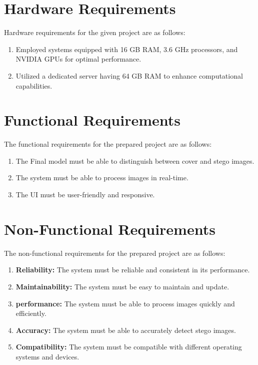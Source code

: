 \section{Hardware Requirements}
Hardware requirements for the given project are as follows:
\begin{enumerate}[noitemsep] %
    \item Employed systems equipped with 16 GB RAM, 3.6 GHz processors, and NVIDIA GPUs for optimal performance.
    \item Utilized a dedicated server having 64 GB RAM to enhance computational capabilities.
   
 \end{enumerate}

 \section{Functional Requirements}
 The functional requirements for the prepared project are as follows:
 \begin{enumerate}[noitemsep]
    \item The Final model must be able to distinguish between cover and stego images.
    \item The system must be able to process images in real-time.
    \item The UI must be user-friendly and responsive.
 \end{enumerate}

 \section{Non-Functional Requirements}
 The non-functional requirements for the prepared project are as follows:
 \begin{enumerate}[noitemsep]
    \item \textbf{Reliability:} The system must be reliable and consistent in its performance.
    \item \textbf{Maintainability:} The system must be easy to maintain and update.
    \item \textbf{performance:} The system must be able to process images quickly and efficiently.
    \item \textbf{Accuracy:} The system must be able to accurately detect stego images.
    \item \textbf{Compatibility:} The system must be compatible with different operating systems and devices.
 \end{enumerate}
